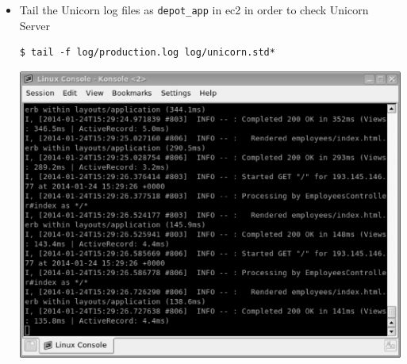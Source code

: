 \documentclass{beamer}
\begin{document}
{\begin{frame}
\begin{itemize}
\item Tail the Unicorn log files as \texttt{depot\_app} in \acrshort{ec2} in order to check Unicorn Server
\lstset{language=shell}
\begin{lstlisting}[escapechar=!]
$ tail -f log/production.log log/unicorn.std*
\end{lstlisting}
\includegraphics[scale=0.15]{lograils.eps}


\end{itemize}
\end{frame}}
\end{document}
